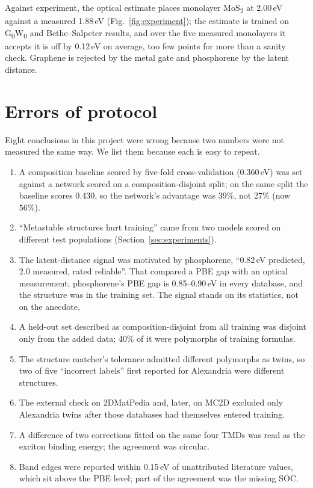 \documentclass[11pt]{article}
\begin{document}
Against experiment, the optical estimate places monolayer MoS\textsubscript{2} at
2.00\,eV against a measured 1.88\,eV (Fig.~\ref{fig:experiment}); the estimate is
trained on G\textsubscript{0}W\textsubscript{0} and Bethe--Salpeter results, and over
the five measured monolayers it accepts it is off by 0.12\,eV on average, too few
points for more than a sanity check. Graphene is rejected by the metal gate and
phosphorene by the latent distance.

\section{Errors of protocol}\label{sec:protocol}

Eight conclusions in this project were wrong because two numbers were not measured the
same way. We list them because each is easy to repeat.
\begin{enumerate}
\item A composition baseline scored by five-fold cross-validation (0.360\,eV) was set
  against a network scored on a composition-disjoint split; on the same split the
  baseline scores 0.430, so the network's advantage was 39\%, not 27\% (now 56\%).
\item ``Metastable structures hurt training'' came from two models scored on different
  test populations (Section~\ref{sec:experiments}).
\item The latent-distance signal was motivated by phosphorene, ``0.82\,eV predicted,
  2.0 measured, rated reliable''. That compared a PBE gap with an optical measurement;
  phosphorene's PBE gap is 0.85--0.90\,eV in every database, and the structure was in
  the training set. The signal stands on its statistics, not on the anecdote.
\item A held-out set described as composition-disjoint from all training was disjoint
  only from the added data; 40\% of it were polymorphs of training formulas.
\item The structure matcher's tolerance admitted different polymorphs as twins, so two
  of five ``incorrect labels'' first reported for Alexandria were different structures.
\item The external check on 2DMatPedia and, later, on MC2D excluded only Alexandria
  twins after those databases had themselves entered training.
\item A difference of two corrections fitted on the same four TMDs was read as the
  exciton binding energy; the agreement was circular.
\item Band edges were reported within 0.15\,eV of unattributed literature values, which
  sit above the PBE level; part of the agreement was the missing SOC.
\end{enumerate}
\end{document}
